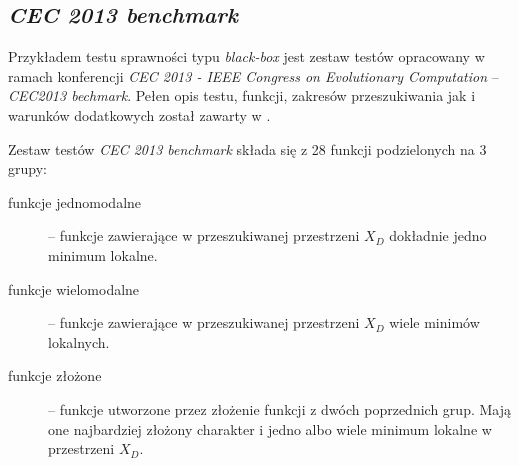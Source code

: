\documentclass[12pt,a4paper]{report}
\begin{document}
{{{{{{\subsection{\emph{CEC 2013 benchmark}}
\label{CEC2013chapter}
\par{
Przykładem testu sprawności typu \emph{black-box} jest zestaw testów opracowany w ramach konferencji \emph{CEC 2013 - IEEE Congress on Evolutionary Computation} -- \emph{CEC2013 bechmark}. Pełen opis testu, funkcji, zakresów przeszukiwania jak i warunków dodatkowych został zawarty w \cite{Li13benchmarkfunctions}.
}
\par{
Zestaw testów \emph{CEC 2013 benchmark} składa się z 28 funkcji podzielonych na 3 grupy:
\begin{description}
\item[funkcje jednomodalne] -- funkcje zawierające w przeszukiwanej przestrzeni $X_D$ dokładnie jedno minimum lokalne.
\item[funkcje wielomodalne] -- funkcje zawierające w przeszukiwanej przestrzeni $X_D$ wiele minimów lokalnych.
\item[funkcje złożone] -- funkcje utworzone przez złożenie funkcji z dwóch poprzednich grup. Mają one najbardziej złożony charakter i jedno albo wiele minimum lokalne w przestrzeni $X_D$.
\end{description}

}}}}}}}
\end{document}
